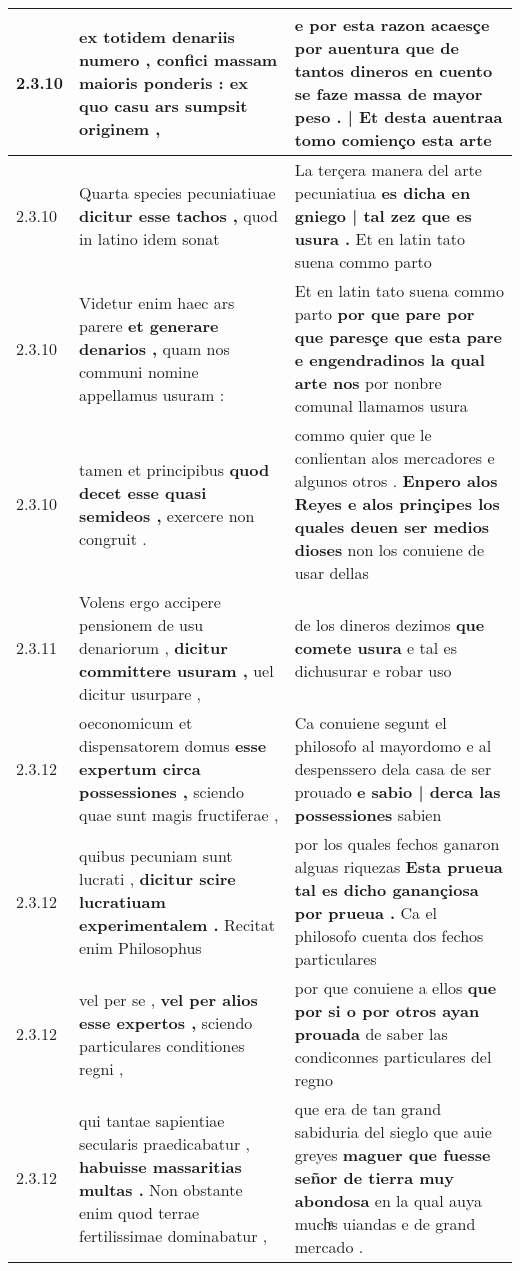 \begin{tabular}{|p{1cm}|p{6.5cm}|p{6.5cm}|}
2.3.10 & ex totidem denariis numero , \textbf{ confici massam maioris ponderis : } ex quo casu ars sumpsit originem , & e por esta razon acaesçe por auentura \textbf{ que de tantos dineros en cuento se faze massa de mayor peso . | Et desta } auentraa tomo comienço esta arte \\\hline
2.3.10 & Quarta species pecuniatiuae \textbf{ dicitur esse tachos , } quod in latino idem sonat & La terçera manera del arte pecuniatiua \textbf{ es dicha en gniego | tal zez que es usura . } Et en latin tato suena commo parto \\\hline
2.3.10 & Videtur enim haec ars parere \textbf{ et generare denarios , } quam nos communi nomine appellamus usuram : & Et en latin tato suena commo parto \textbf{ por que pare por que paresçe que esta pare e engendradinos la qual arte nos } por nonbre comunal llamamos usura \\\hline
2.3.10 & tamen et principibus \textbf{ quod decet esse quasi semideos , } exercere non congruit . & commo quier que le conlientan alos mercadores e algunos otros . \textbf{ Enpero alos Reyes e alos prinçipes los quales deuen ser medios dioses } non los conuiene de usar dellas \\\hline
2.3.11 & Volens ergo accipere pensionem de usu denariorum , \textbf{ dicitur committere usuram , } uel dicitur usurpare , & de los dineros dezimos \textbf{ que comete usura } e tal es dichusurar e robar uso \\\hline
2.3.12 & oeconomicum et dispensatorem domus \textbf{ esse expertum circa possessiones , } sciendo quae sunt magis fructiferae , & Ca conuiene segunt el philosofo al mayordomo e al despenssero dela casa de ser prouado \textbf{ e sabio | derca las possessiones } sabien \\\hline
2.3.12 & quibus pecuniam sunt lucrati , \textbf{ dicitur scire lucratiuam experimentalem . } Recitat enim Philosophus & por los quales fechos ganaron alguas riquezas \textbf{ Esta prueua tal es dicho ganançiosa por prueua . } Ca el philosofo cuenta dos fechos particulares \\\hline
2.3.12 & vel per se , \textbf{ vel per alios esse expertos , } sciendo particulares conditiones regni , & por que conuiene a ellos \textbf{ que por si o por otros ayan prouada } de saber las condiconnes particulares del regno \\\hline
2.3.12 & qui tantae sapientiae secularis praedicabatur , \textbf{ habuisse massaritias multas . } Non obstante enim quod terrae fertilissimae dominabatur , & que era de tan grand sabiduria del sieglo que auie greyes \textbf{ maguer que fuesse señor de tierra muy abondosa } en la qual auya muchͣs uiandas e de grand mercado . \\\hline

\end{tabular}

